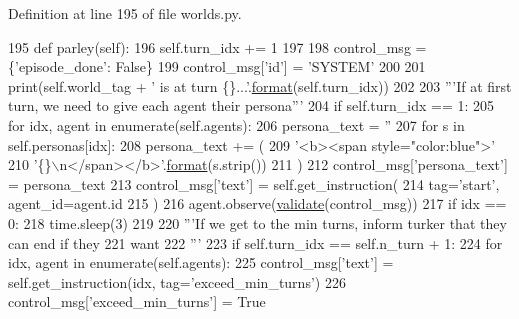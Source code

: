 Definition at line 195 of file worlds.\+py.


\begin{DoxyCode}
195     \textcolor{keyword}{def }parley(self):
196         self.turn\_idx += 1
197 
198         control\_msg = \{\textcolor{stringliteral}{'episode\_done'}: \textcolor{keyword}{False}\}
199         control\_msg[\textcolor{stringliteral}{'id'}] = \textcolor{stringliteral}{'SYSTEM'}
200 
201         print(self.world\_tag + \textcolor{stringliteral}{' is at turn \{\}...'}.\hyperlink{namespaceparlai_1_1chat__service_1_1services_1_1messenger_1_1shared__utils_a32e2e2022b824fbaf80c747160b52a76}{format}(self.turn\_idx))
202 
203         \textcolor{stringliteral}{'''If at first turn, we need to give each agent their persona'''}
204         \textcolor{keywordflow}{if} self.turn\_idx == 1:
205             \textcolor{keywordflow}{for} idx, agent \textcolor{keywordflow}{in} enumerate(self.agents):
206                 persona\_text = \textcolor{stringliteral}{''}
207                 \textcolor{keywordflow}{for} s \textcolor{keywordflow}{in} self.personas[idx]:
208                     persona\_text += (
209                         \textcolor{stringliteral}{'<b><span style="color:blue">'}
210                         \textcolor{stringliteral}{'\{\}\(\backslash\)n</span></b>'}.\hyperlink{namespaceparlai_1_1chat__service_1_1services_1_1messenger_1_1shared__utils_a32e2e2022b824fbaf80c747160b52a76}{format}(s.strip())
211                     )
212                 control\_msg[\textcolor{stringliteral}{'persona\_text'}] = persona\_text
213                 control\_msg[\textcolor{stringliteral}{'text'}] = self.get\_instruction(
214                     tag=\textcolor{stringliteral}{'start'}, agent\_id=agent.id
215                 )
216                 agent.observe(\hyperlink{namespaceparlai_1_1core_1_1worlds_afc3fad603b7bce41dbdc9cdc04a9c794}{validate}(control\_msg))
217                 \textcolor{keywordflow}{if} idx == 0:
218                     time.sleep(3)
219 
220         \textcolor{stringliteral}{'''If we get to the min turns, inform turker that they can end if they}
221 \textcolor{stringliteral}{           want}
222 \textcolor{stringliteral}{        '''}
223         \textcolor{keywordflow}{if} self.turn\_idx == self.n\_turn + 1:
224             \textcolor{keywordflow}{for} idx, agent \textcolor{keywordflow}{in} enumerate(self.agents):
225                 control\_msg[\textcolor{stringliteral}{'text'}] = self.get\_instruction(idx, tag=\textcolor{stringliteral}{'exceed\_min\_turns'})
226                 control\_msg[\textcolor{stringliteral}{'exceed\_min\_turns'}] = \textcolor{keyword}{True}

\end{DoxyCode}

